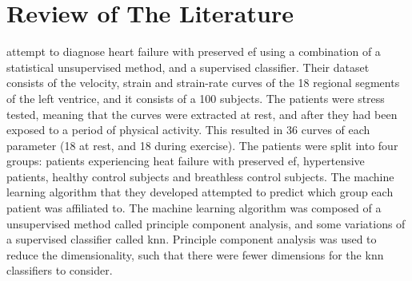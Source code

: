 \chapter{Review of The Literature} \label{chap:lit}

\textcite{hf_diagnosis_ml} attempt to diagnose heart failure with preserved \acrshort{ef} using a combination of a statistical unsupervised method, and a supervised classifier. Their dataset consists of the velocity, strain and strain-rate curves of the 18 regional segments of the left ventrice, and it consists of a 100 subjects. The patients were stress tested, meaning that the curves were extracted at rest, and after they had been exposed to a period of physical activity. This resulted in 36 curves of each parameter (18 at rest, and 18 during exercise). The patients were split into four groups: patients experiencing heat failure with preserved \acrshort{ef}, hypertensive patients, healthy control subjects and breathless control subjects. The machine learning algorithm that they developed attempted to predict which group each patient was affiliated to. The machine learning algorithm was composed of a unsupervised method called principle component analysis, and some variations of a supervised classifier called \acrfull{knn}. Principle component analysis was used to reduce the dimensionality, such that there were fewer dimensions for the \acrshort{knn} classifiers to consider. 
